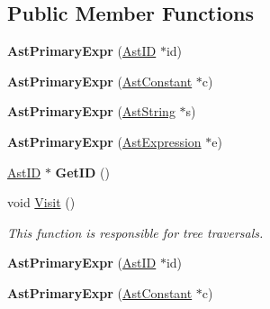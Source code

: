 \subsection*{Public Member Functions}
\begin{DoxyCompactItemize}
\item 
\hypertarget{classAstPrimaryExpr_a92ac6a98d42e522c7476768c959e2044}{{\bfseries Ast\-Primary\-Expr} (\hyperlink{classAstID}{Ast\-I\-D} $\ast$id)}\label{classAstPrimaryExpr_a92ac6a98d42e522c7476768c959e2044}

\item 
\hypertarget{classAstPrimaryExpr_a03809c945a11ab5345f50956cff84f82}{{\bfseries Ast\-Primary\-Expr} (\hyperlink{classAstConstant}{Ast\-Constant} $\ast$c)}\label{classAstPrimaryExpr_a03809c945a11ab5345f50956cff84f82}

\item 
\hypertarget{classAstPrimaryExpr_a784c92261d262fe4952963af0dd891e7}{{\bfseries Ast\-Primary\-Expr} (\hyperlink{classAstString}{Ast\-String} $\ast$s)}\label{classAstPrimaryExpr_a784c92261d262fe4952963af0dd891e7}

\item 
\hypertarget{classAstPrimaryExpr_a75b1363ac6a376ea3de63e03700072d8}{{\bfseries Ast\-Primary\-Expr} (\hyperlink{classAstExpression}{Ast\-Expression} $\ast$e)}\label{classAstPrimaryExpr_a75b1363ac6a376ea3de63e03700072d8}

\item 
\hypertarget{classAstPrimaryExpr_a0c5a0ec5399baf9dd319ba0f77e9111e}{\hyperlink{classAstID}{Ast\-I\-D} $\ast$ {\bfseries Get\-I\-D} ()}\label{classAstPrimaryExpr_a0c5a0ec5399baf9dd319ba0f77e9111e}

\item 
void \hyperlink{classAstPrimaryExpr_adfc316933183cada2963b7b855ddb824}{Visit} ()
\begin{DoxyCompactList}\small\item\em This function is responsible for tree traversals. \end{DoxyCompactList}\item 
\hypertarget{classAstPrimaryExpr_a92ac6a98d42e522c7476768c959e2044}{{\bfseries Ast\-Primary\-Expr} (\hyperlink{classAstID}{Ast\-I\-D} $\ast$id)}\label{classAstPrimaryExpr_a92ac6a98d42e522c7476768c959e2044}

\item 
\hypertarget{classAstPrimaryExpr_a03809c945a11ab5345f50956cff84f82}{{\bfseries Ast\-Primary\-Expr} (\hyperlink{classAstConstant}{Ast\-Constant} $\ast$c)}\label{classAstPrimaryExpr_a03809c945a11ab5345f50956cff84f82}


\end{DoxyCompactItemize}
